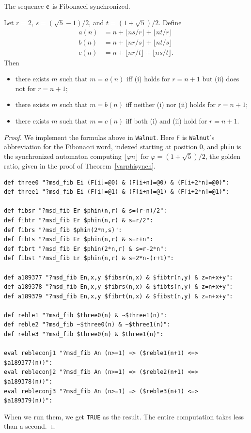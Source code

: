 \documentclass[10pt,a4paper]{amsart}
\begin{document}
\begin{theorem}
The sequence $\bf c$ is Fibonacci synchronized.
\label{varphisynch}
\end{theorem}

\begin{theorem}
Let $r = 2$, $s = (\sqrt{5}-1)/2$, and $t = (1+\sqrt{5})/2$.
Define
\begin{align*}
a(n) &= n + \lfloor ns/r \rfloor + \lfloor nt/r \rfloor \\
b(n) &= n + \lfloor nr/s \rfloor + \lfloor nt/s \rfloor \\
c(n) &= n + \lfloor nr/t \rfloor + \lfloor ns/t \rfloor .
\end{align*}
Then 
\begin{itemize}
\item[(a)]
there exists $m$ such that $m = a(n)$ iff (i) holds
for $r= n+1$ but (ii) does not for $r = n+1$;
\item[(b)]
there exists $m$ such that $m = b(n)$ iff neither
(i) nor (ii) holds for $r = n+1$;
\item[(c)]
there exists $m$ such that $m = c(n)$ iff both
(i) and (ii) hold for $r = n+1$.
\end{itemize}
\end{theorem}

\begin{proof}
We implement the formulas above in \texttt{Walnut}.   Here {\tt F} is {\tt Walnut}'s abbreviation for the Fibonacci word, indexed starting at position $0$,
and {\tt phin} is the synchronized automaton computing
$\lfloor \varphi n \rfloor$ for $\varphi = (1+\sqrt{5})/2$, the golden ratio,
given in the proof of Theorem~\ref{varphisynch}.
\begin{verbatim}
def three0 "?msd_fib Ei (F[i]=@0) & (F[i+n]=@0) & (F[i+2*n]=@0)":
def three1 "?msd_fib Ei (F[i]=@1) & (F[i+n]=@1) & (F[i+2*n]=@1)":

def fibsr "?msd_fib Er $phin(n,r) & s=(r-n)/2":
def fibtr "?msd_fib Er $phin(n,r) & s=r/2":
def fibrs "?msd_fib $phin(2*n,s)":
def fibts "?msd_fib Er $phin(n,r) & s=r+n":
def fibrt "?msd_fib Er $phin(2*n,r) & s=r-2*n":
def fibst "?msd_fib Er $phin(n,r) & s=2*n-(r+1)":

def a189377 "?msd_fib En,x,y $fibsr(n,x) & $fibtr(n,y) & z=n+x+y":
def a189378 "?msd_fib En,x,y $fibrs(n,x) & $fibts(n,y) & z=n+x+y":
def a189379 "?msd_fib En,x,y $fibrt(n,x) & $fibst(n,y) & z=n+x+y":

def reble1 "?msd_fib $three0(n) & ~$three1(n)":
def reble2 "?msd_fib ~$three0(n) & ~$three1(n)":
def reble3 "?msd_fib $three0(n) & $three1(n)":

eval rebleconj1 "?msd_fib An (n>=1) => ($reble1(n+1) <=> $a189377(n))":
eval rebleconj2 "?msd_fib An (n>=1) => ($reble2(n+1) <=> $a189378(n))":
eval rebleconj3 "?msd_fib An (n>=1) => ($reble3(n+1) <=> $a189379(n))":
\end{verbatim}
When we run them, we get 
\texttt{TRUE}
as the result.   The entire computation takes less than a second.
\end{proof}
\end{document}
